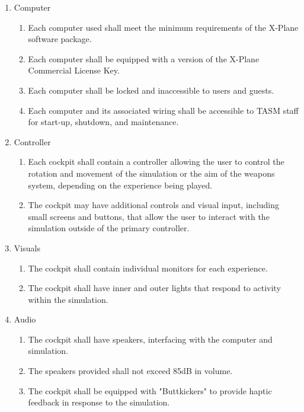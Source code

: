 \documentclass[12pt]{article} %
\begin{document}
\begin{enumerate}[label=\arabic*, leftmargin=*]
	\item Computer
	\begin{enumerate}[label=\arabic{enumi}.\arabic*, leftmargin=*]
		\item Each computer used shall meet the minimum requirements of the X-Plane software package.
		\item Each computer shall be equipped with a version of the X-Plane Commercial License Key. 
		\item Each computer shall be locked and inaccessible to users and guests. 
		\item Each computer and its associated wiring shall be accessible to TASM staff for start-up, shutdown, and maintenance.
	\end{enumerate}
	\item Controller
	\begin{enumerate}[label=\arabic{enumi}.\arabic*, leftmargin=*]
		\item Each cockpit shall contain a controller allowing the user to control the rotation and movement of the simulation or the aim of the weapons system, depending on the experience being played. 
		\item The cockpit may have additional controls and visual input, including small screens and buttons, that allow the user to interact with the simulation outside of the primary controller. 
	\end{enumerate}
	\item Visuals
	\begin{enumerate}[label=\arabic{enumi}.\arabic*, leftmargin=*]
		\item The cockpit shall contain individual monitors for each experience. 
		\item The cockpit shall have inner and outer lights that respond to activity within the simulation.
	\end{enumerate}
	\item Audio
	\begin{enumerate}[label=\arabic{enumi}.\arabic*, leftmargin=*]
		\item The cockpit shall have speakers, interfacing with the computer and simulation. 
		\item The speakers provided shall not exceed 85dB in volume. 
		\item The cockpit shall be equipped with "Buttkickers" to provide haptic feedback in response to the simulation.
	\end{enumerate}

\end{enumerate}
\end{document}
